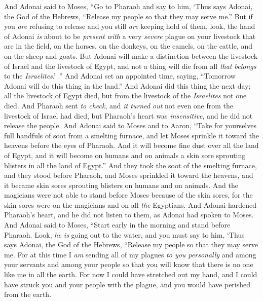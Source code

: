 \begin{biblechapter} %
 And Adonai said to Moses, “Go to Pharaoh and say to him, ‘Thus says Adonai, the God of the Hebrews, “Release my people so that they may serve me.”
\verse But if you \textit{are} refusing to release and you still \textit{are} keeping hold of them,
\verse look, the hand of Adonai \textit{is} about to be \textit{present with} a very \textit{severe} plague on your livestock that are in the field, on the horses, on the donkeys, on the camels, on the cattle, and on the sheep and goats.
\verse But Adonai will make a distinction between the livestock of Israel and the livestock of Egypt, and not a thing will die from all \textit{that belongs} to the \textit{Israelites}.’ ”
\verse And Adonai set an appointed time, saying, “Tomorrow Adonai will do this thing in the land.”
\verse And Adonai did this thing the next day; all the livestock of Egypt died, but from the livestock of the \textit{Israelites} not one died.
\verse And Pharaoh sent \textit{to check}, and \textit{it turned out} not even one from the livestock of Israel had died, but Pharaoh’s heart was \textit{insensitive}, and he did not release the people.
 And Adonai said to Moses and to Aaron, “Take for yourselves full handfuls of soot from a smelting furnace, and let Moses sprinkle it toward the heavens before the eyes of Pharaoh.
\verse And it will become fine dust over all the land of Egypt, and it will become on humans and on animals a skin sore sprouting blisters in all the land of Egypt.”
\verse And they took the soot of the smelting furnace, and they stood before Pharaoh, and Moses sprinkled it toward the heavens, and it became skin sores sprouting blisters on humans and on animals.
\verse And the magicians were not able to stand before Moses because of the skin sores, for the skin sores were on the magicians and on all \textit{the} Egyptians.
\verse And Adonai hardened Pharaoh’s heart, and he did not listen to them, as Adonai had spoken to Moses.
 And Adonai said to Moses, “Start early in the morning and stand before Pharaoh. Look, \textit{he is} going out to the water, and you must say to him, ‘Thus says Adonai, the God of the Hebrews, “Release my people so that they may serve me.
\verse For at this time I \textit{am} sending all of my plagues \textit{to you personally} and among your servants and among your people so that you will know that there is no one like me in all the earth.
\verse For now I could have stretched out my hand, and I could have struck you and your people with the plague, and you would have perished from the earth.

\end{biblechapter}
